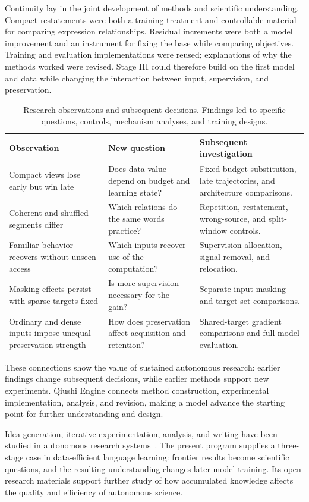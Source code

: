 Continuity lay in the joint development of methods and scientific understanding. Compact restatements were both a training treatment and controllable material for comparing expression relationships. Residual increments were both a model improvement and an instrument for fixing the base while comparing objectives. Training and evaluation implementations were reused; explanations of why the methods worked were revised. Stage III could therefore build on the first model and data while changing the interaction between input, supervision, and preservation.

\begin{table}[htbp]
\caption{Research observations and subsequent decisions. Findings led to specific questions, controls, mechanism analyses, and training designs.}
\label{tab:research_decisions}
\small
\begin{tabularx}{\linewidth}{@{}Y Y Y@{}}
\toprule Observation & New question & Subsequent investigation\\\midrule
Compact views lose early but win late & Does data value depend on budget and learning state? & Fixed-budget substitution, late trajectories, and architecture comparisons.\\
Coherent and shuffled segments differ & Which relations do the same words practice? & Repetition, restatement, wrong-source, and split-window controls.\\
Familiar behavior recovers without unseen access & Which inputs recover use of the computation? & Supervision allocation, signal removal, and relocation.\\
Masking effects persist with sparse targets fixed & Is more supervision necessary for the gain? & Separate input-masking and target-set comparisons.\\
Ordinary and dense inputs impose unequal preservation strength & How does preservation affect acquisition and retention? & Shared-target gradient comparisons and full-model evaluation.\\
\bottomrule
\end{tabularx}
\end{table}

These connections show the value of sustained autonomous research: earlier findings change subsequent decisions, while earlier methods support new experiments. Qiushi Engine connects method construction, experimental implementation, analysis, and revision, making a model advance the starting point for further understanding and design.

Idea generation, iterative experimentation, analysis, and writing have been studied in autonomous research systems~\citep{lu2026automation}. The present program supplies a three-stage case in data-efficient language learning: frontier results become scientific questions, and the resulting understanding changes later model training. Its open research materials support further study of how accumulated knowledge affects the quality and efficiency of autonomous science.

